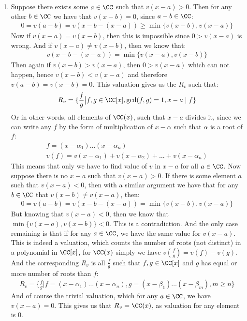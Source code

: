 \begin{enumerate}[label=]
    \item 
        Suppose there exists some $a \in \CC$ such that $v(x - a) > 0$. Then for any other $b \in \CC$ we have that $v(x - b) = 0$, since $a - b \in \CC$:
        \begin{gather*}
            0 = v(a - b) = v(x - b - (x - a)) \ge \min \{v(x - b), v(x - a) \}
        \end{gather*}
        Now if $v(x - a) = v(x - b)$, then this is impossible since $0 > v(x - a)$ is wrong.
        And if $v(x - a) \ne v(x - b)$, then we know that:
        \begin{gather*}
            v(x - b - (x - a)) = \min \{ v(x - a), v(x - b) \}
        \end{gather*}
        Then again if $v(x - b) > v(x - a)$, then $0 > v(x - a)$ which can not happen, hence $v(x - b) < v(x - a)$ and therefore $v(a - b) = v(x - b) = 0$.
        This valuation gives us the $R_v$ such that:
        \begin{gather*}
            R_v = \{ \frac{f}{g} \big| f, g \in \CC[x], \gcd(f, g) = 1, x - a \mid f \} 
        \end{gather*}
        Or in other words, all elements of $\CC(x)$, such that $x - a$ divides it, since we can write any $f$ by the form of multiplication of $x - \alpha$ such that $\alpha$ is a root of $f$:
        \begin{gather*}
            f = (x - \alpha_1) \dots (x - \alpha_n) \\
            v(f) = v(x - \alpha_1) + v(x - \alpha_2) + \dots + v(x - \alpha_n)
        \end{gather*}
        This means that only we have to find value of $v$ in $x - a$ for all $a \in \CC$.
        Now suppose there is no $x- a$ such that $v(x - a) > 0$. If there is some element $a$ such that $v(x - a) < 0$, then with a similar argument we have that for any $b \in \CC$ that $v(x - b) \ne v(x - a)$, then:
        \begin{gather*}
            0 = v(a - b) = v(x - b - (x - a)) = \min \{v(x - b), v(x - a) \} 
        \end{gather*}
        But knowing that $v(x - a) < 0$, then we know that $\min \{v(x - a), v(x - b) \} < 0$. This is a contradiction. And the only case remaining is that if for any $a \in \CC$, we have the same value for $v(x - a)$. This is indeed a valuation, which counts the number of roots (not distinct) in a polynomial in $\CC[x]$, for $\CC(x)$ simply we have $v(\frac{f}{g}) = v(f) - v(g)$.
        And the corresponding $R_v$ is all $\frac{f}{g}$ such that $f, g \in \CC[x]$ and $g$ has equal or more number of roots than $f$:
        \begin{gather*}
            R_v = \{\frac{f}{g} \big| f = (x - \alpha_1) \dots (x - \alpha_n), g = (x - \beta_1) \dots (x - \beta_m), m \ge n\}
        \end{gather*}
        And of course the trivial valuation, which for any $a \in \CC$, we have $v(x - a) = 0$. This gives us that $R_v = \CC(x)$, as valuation for any element is $0$.
\end{enumerate}
